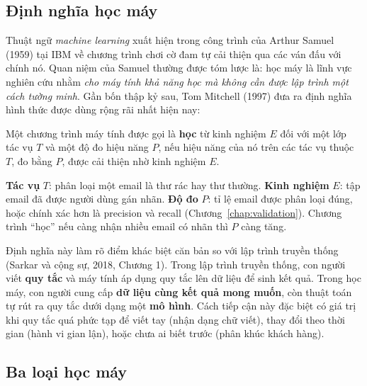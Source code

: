 \subsection{Định nghĩa học máy}

Thuật ngữ \textit{machine learning} xuất hiện trong công trình của Arthur Samuel (1959) tại IBM về chương trình chơi cờ đam tự cải thiện qua các ván đấu với chính nó. Quan niệm của Samuel thường được tóm lược là: học máy là lĩnh vực nghiên cứu nhằm \textit{cho máy tính khả năng học mà không cần được lập trình một cách tường minh}. Gần bốn thập kỷ sau, Tom Mitchell (1997) đưa ra định nghĩa hình thức được dùng rộng rãi nhất hiện nay:

\begin{definition}
Một chương trình máy tính được gọi là \textbf{học} từ kinh nghiệm $E$ đối với một lớp tác vụ $T$ và một độ đo hiệu năng $P$, nếu hiệu năng của nó trên các tác vụ thuộc $T$, đo bằng $P$, được cải thiện nhờ kinh nghiệm $E$.
\end{definition}

\begin{example}
\textbf{Tác vụ} $T$: phân loại một email là thư rác hay thư thường. \textbf{Kinh nghiệm} $E$: tập email đã được người dùng gán nhãn. \textbf{Độ đo} $P$: tỉ lệ email được phân loại đúng, hoặc chính xác hơn là precision và recall (Chương~\ref{chap:validation}). Chương trình ``học'' nếu càng nhận nhiều email có nhãn thì $P$ càng tăng.
\end{example}

Định nghĩa này làm rõ điểm khác biệt căn bản so với lập trình truyền thống (Sarkar và cộng sự, 2018, Chương 1). Trong lập trình truyền thống, con người viết \textbf{quy tắc} và máy tính áp dụng quy tắc lên dữ liệu để sinh kết quả. Trong học máy, con người cung cấp \textbf{dữ liệu cùng kết quả mong muốn}, còn thuật toán tự rút ra quy tắc dưới dạng một \textbf{mô hình}. Cách tiếp cận này đặc biệt có giá trị khi quy tắc quá phức tạp để viết tay (nhận dạng chữ viết), thay đổi theo thời gian (hành vi gian lận), hoặc chưa ai biết trước (phân khúc khách hàng).


\subsection{Ba loại học máy}


